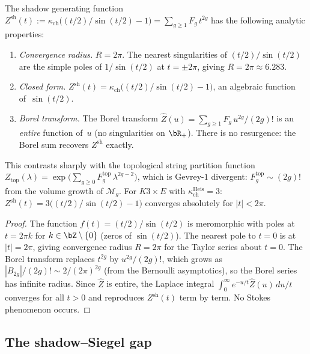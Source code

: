 \begin{proposition}
\label{prop:shadow-gf-convergence}
The shadow generating function
$Z^{\mathrm{sh}}(t) := \kappa_{\mathrm{ch}}\bigl((t/2)/\sin(t/2) - 1\bigr)
= \sum_{g \geq 1} F_g\,t^{2g}$ has the following analytic
properties:
\begin{enumerate}[label=\textup{(\roman*)}]
\item \emph{Convergence radius.}
$R = 2\pi$. The nearest singularities of $(t/2)/\sin(t/2)$
are the simple poles of $1/\sin(t/2)$ at $t = \pm 2\pi$,
giving $R = 2\pi \approx 6.283$.
\item \emph{Closed form.}
$Z^{\mathrm{sh}}(t) = \kappa_{\mathrm{ch}}\bigl((t/2)/\sin(t/2) - 1\bigr)$,
an algebraic function of~$\sin(t/2)$.
\item \emph{Borel transform.}
The Borel transform $\hat{Z}(u)
= \sum_{g \geq 1} F_g\,u^{2g}/(2g)!$ is an
\emph{entire} function of~$u$ \textup{(}no singularities
on $\bR_+$\textup{)}. There is no resurgence: the
Borel sum recovers $Z^{\mathrm{sh}}$ exactly.
\end{enumerate}
This contrasts sharply with the topological string partition
function $Z_{\mathrm{top}}(\lambda) = \exp\bigl(\sum_{g \geq 0}
F_g^{\mathrm{top}}\,\lambda^{2g-2}\bigr)$, which is
Gevrey-$1$ divergent: $F_g^{\mathrm{top}} \sim (2g)!$ from
the volume growth of $\mathcal{M}_g$.
For $K3 \times E$ with $\kappa_{\mathrm{ch}}^{\mathrm{Heis}} = 3$:
$Z^{\mathrm{sh}}(t) = 3\bigl((t/2)/\sin(t/2) - 1\bigr)$
converges absolutely for $|t| < 2\pi$.
\end{proposition}

\begin{proof}
The function $f(t) = (t/2)/\sin(t/2)$ is meromorphic with poles
at $t = 2\pi k$ for $k \in \bZ \setminus \{0\}$ (zeros of
$\sin(t/2)$). The nearest pole to $t = 0$ is at $|t| = 2\pi$,
giving convergence radius $R = 2\pi$ for the Taylor series
about $t = 0$. The Borel transform replaces $t^{2g}$ by
$u^{2g}/(2g)!$, which grows as $|B_{2g}|/(2g)! \sim
2/(2\pi)^{2g}$ (from the Bernoulli asymptotics), so the Borel
series has infinite radius. Since $\hat{Z}$ is entire, the
Laplace integral $\int_0^\infty e^{-u/t}\hat{Z}(u)\,du/t$
converges for all $t > 0$ and reproduces $Z^{\mathrm{sh}}(t)$
term by term. No Stokes phenomenon occurs.
\end{proof}

\subsection{The shadow--Siegel gap}
\label{subsec:shadow-siegel-gap}

